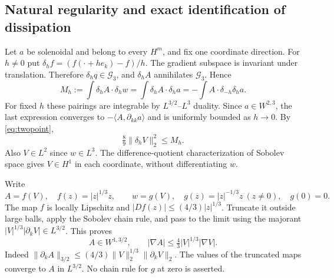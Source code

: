 \documentclass[11pt,a4paper]{article}
\theoremstyle{definition}\newtheorem{definition}[theorem]{Definition}
\theoremstyle{remark}\newtheorem{remark}[theorem]{Remark}
\newcommand{\G}{\mathcal G_3}
\newcommand{\norm}[1]{\lVert #1\rVert}
\newcommand{\ip}[2]{\langle #1,#2\rangle}
\numberwithin{equation}{section}
\begin{document}
\subsection{Natural regularity and exact identification of dissipation}
Let $a$ be solenoidal and belong to every $H^m$, and fix one coordinate direction. For $h\ne0$ put $\delta_hf=(f(\cdot+he_k)-f)/h$. The gradient subspace is invariant under translation. Therefore $\delta_hq\in\G$, and $\delta_hA$ annihilates $\G$. Hence
\begin{equation}\label{eq:differenceidentity}
 M_h:=\int\delta_hA\cdot\delta_hw
 =\int\delta_hA\cdot\delta_ha
 =-\int A\cdot\delta_{-h}\delta_ha.
\end{equation}
For fixed $h$ these pairings are integrable by $L^{3/2}$--$L^3$ duality. Since $a\in W^{2,3}$, the last expression converges to $-\ip A{\partial_{kk}a}$ and is uniformly bounded as $h\to0$. By \eqref{eq:twopoint},
\[
 \tfrac89\norm{\delta_hV}_2^2\le M_h.
\]
Also $V\in L^2$ since $w\in L^3$. The difference-quotient characterization of Sobolev space gives $V\in H^1$ in each coordinate, without differentiating $w$.

Write
\[
 A=f(V),\quad f(z)=|z|^{1/3}z,
 \qquad w=g(V),\quad g(z)=|z|^{-1/3}z\ (z\ne0),\quad g(0)=0.
\]
The map $f$ is locally Lipschitz and $|Df(z)|\le(4/3)|z|^{1/3}$. Truncate it outside large balls, apply the Sobolev chain rule, and pass to the limit using the majorant $|V|^{1/3}|\partial_kV|\in L^{3/2}$. This proves
\begin{equation}\label{eq:Achain}
 A\in W^{1,3/2},\qquad
 |\nabla A|\le\tfrac43|V|^{1/3}|\nabla V|.
\end{equation}
Indeed $\norm{\partial_kA}_{3/2}\le(4/3)\norm V_2^{1/3}\norm{\partial_kV}_2$. The values of the truncated maps converge to $A$ in $L^{3/2}$. No chain rule for $g$ at zero is asserted.
\end{document}
